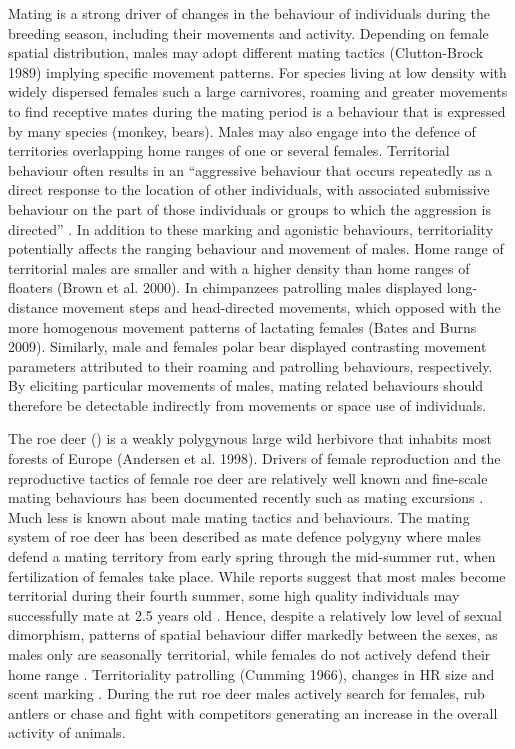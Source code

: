 \documentclass[a4paper,11pt]{article}
\newcommand{\nico}[1]{\todo[backgroundcolor=red!25,bordercolor=red]{\small #1}}
\newcommand{\species}[1]{(\xmakefirstuc{\emph{#1}})}
\begin{document}
Mating is a strong driver of changes in the behaviour of individuals
during the breeding season, including their movements and
activity. Depending on female spatial distribution, males may adopt
different mating tactics (Clutton-Brock 1989) implying specific
movement patterns. For species living at low density with widely
dispersed females such a large carnivores, roaming and greater
movements to find receptive mates during the mating period is a
behaviour that is expressed by many species (monkey, bears). Males may
also engage into the defence of territories overlapping home ranges of
one or several females. Territorial behaviour often results in an
“aggressive behaviour that occurs repeatedly as a direct response to
the location of other individuals, with associated submissive
behaviour on the part of those individuals or groups to which the
aggression is directed” \citep{pyke_territoriality_1996}. In addition
to these marking and agonistic behaviours, territoriality potentially
affects the ranging behaviour and movement of males. Home range of
territorial males are smaller and with a higher density than home
ranges of floaters (Brown et al. 2000). In chimpanzees patrolling
males displayed long-distance movement steps and head-directed
movements, which opposed with the more homogenous movement patterns of
lactating females (Bates and Burns 2009). Similarly, male and females
polar bear displayed contrasting movement parameters attributed to
their roaming and patrolling behaviours, respectively. By eliciting
particular movements of males, mating related behaviours should
therefore be detectable indirectly from movements or space use of
individuals.

The roe deer \species{Capreolus capreolus} is a weakly polygynous
large wild herbivore that inhabits most forests of Europe (Andersen et
al. 1998). Drivers of female reproduction and the reproductive tactics
of female roe deer are relatively well known
\citep{andersen_social_1998} and fine-scale mating behaviours has been
documented recently such as mating excursions
\citep{debeffe_one_2014}. Much less is known about male mating tactics
and behaviours. The mating system of roe deer has been described as
mate defence polygyny \citep{vanpe_mating_2008} where males defend a
mating territory from early spring through the mid-summer rut, when
fertilization of females take place. While reports suggest that most
males become territorial during their fourth summer, some high quality
individuals may successfully mate at 2.5 years old
\citep{vanpe_age-specific_2009}. Hence, despite a relatively low level
of sexual dimorphism, patterns of spatial behaviour differ markedly
between the sexes, as males only are seasonally territorial, while
females do not actively defend their home range \citep[but
see][]{maublanc_ranging_2012}. Territoriality patrolling (Cumming
1966), changes in HR size and scent marking
\citep{gosling_reassessment_1982} \nico{il manque quelque chose!}. During the rut roe deer males
actively search for females, rub antlers or chase and fight with
competitors generating an increase in the overall activity of animals.
\end{document}
